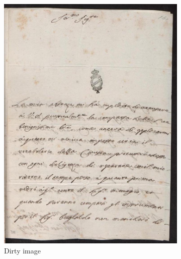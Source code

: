\documentclass[%
 reprint,
 amsmath,amssymb,
 aps,
]{revtex4-1}
\begin{document}
\begin{figure}%
\centering
\begin{subfigure}{.9\columnwidth}
\includegraphics[width=\columnwidth]{45}%
\caption{Dirty image}%
\label{subfiga}%
\end{subfigure}\hfill%
\begin{subfigure}{.9\columnwidth}

\end{subfigure}
\end{figure}
\end{document}
